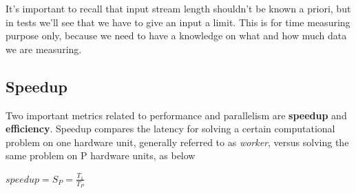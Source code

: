 It's important to recall that input stream length shouldn't be known a priori, but in tests we'll see that we have to give an input a limit. This is for time measuring purpose only, because we need to have a knowledge on what and how much data we are measuring.


\subsection{Speedup}
\label{susb:speedup}
Two important metrics related to performance and parallelism are \textbf{speedup} and \textbf{efficiency}. Speedup compares the latency for solving a certain computational problem on one hardware unit, generally referred to as \textit{worker}, versus solving the same problem on P hardware units, as below
\begin{center}
	\(speedup = S_{P} = \frac{T_{1}}{T_{P}} \)
\end{center}


